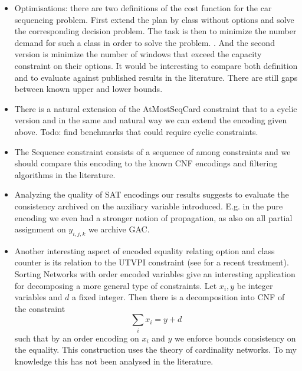 \documentclass[]{llncs}
\newcommand{\AtMostSeqCard}{AtMostSeqCard }
\begin{document}
\begin{itemize}
    \item Optimisations: there are two definitions of the cost function
        for the car sequencing problem. First extend the plan by class
        without options and solve the corresponding decision problem.
        The task is then to minimize the number demand for such a class
        in order to solve the problem.  . And the second version is
        minimize the number of windows that exceed the capacity
        constraint on their options. It would be interesting to compare
        both definition and to evaluate against published results in the
        literature. There are still gaps between known upper and lower
        bounds. 
    \item There is a natural extension of the \AtMostSeqCard constraint
        that to a cyclic version and in the same and natural way we can
        extend the encoding given above. Todo: find benchmarks that
        could require cyclic constraints. 
    \item The Sequence constraint consists of a sequence of among
        constraints and we should compare this encoding to the known CNF
        encodings and filtering algorithms in the literature. 
    \item Analyzing the quality of SAT encodings our results suggests to
        evaluate the consistency archived on the auxiliary variable
        introduced. E.g. in the pure encoding we even had a
        stronger notion of propagation, as also on all partial
        assignment on $y_{i,j,k}$ we archive GAC. 
    \item Another interesting aspect of encoded equality relating option
        and class counter is its relation to the UTVPI constraint (see
        \cite{Seshia07} for a recent treatment). Sorting Networks with
        order encoded variables give an interesting application for
        decomposing a more general type of constraints. Let $x_i, y$ be
        integer variables and $d$ a fixed integer. Then there is a
        decomposition into CNF of the constraint $$ \sum_i x_i = y + d $$
        such that by an order encoding on $x_i$ and $y$ we enforce
        bounds consistency on the equality. This construction uses the
        theory of cardinality networks. To my knowledge this has not
        been analysed in the literature. 
\end{itemize}



\end{document}
